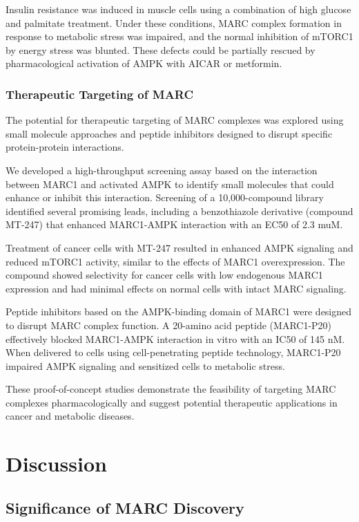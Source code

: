 \documentclass[11pt,a4paper]{article}
\begin{document}
Insulin resistance was induced in muscle cells using a combination of high glucose and palmitate treatment. Under these conditions, MARC complex formation in response to metabolic stress was impaired, and the normal inhibition of mTORC1 by energy stress was blunted. These defects could be partially rescued by pharmacological activation of AMPK with AICAR or metformin.

\subsubsection{Therapeutic Targeting of MARC}

The potential for therapeutic targeting of MARC complexes was explored using small molecule approaches and peptide inhibitors designed to disrupt specific protein-protein interactions.

We developed a high-throughput screening assay based on the interaction between MARC1 and activated AMPK to identify small molecules that could enhance or inhibit this interaction. Screening of a 10,000-compound library identified several promising leads, including a benzothiazole derivative (compound MT-247) that enhanced MARC1-AMPK interaction with an EC50 of 2.3 muM.

Treatment of cancer cells with MT-247 resulted in enhanced AMPK signaling and reduced mTORC1 activity, similar to the effects of MARC1 overexpression. The compound showed selectivity for cancer cells with low endogenous MARC1 expression and had minimal effects on normal cells with intact MARC signaling.

Peptide inhibitors based on the AMPK-binding domain of MARC1 were designed to disrupt MARC complex function. A 20-amino acid peptide (MARC1-P20) effectively blocked MARC1-AMPK interaction in vitro with an IC50 of 145 nM. When delivered to cells using cell-penetrating peptide technology, MARC1-P20 impaired AMPK signaling and sensitized cells to metabolic stress.

These proof-of-concept studies demonstrate the feasibility of targeting MARC complexes pharmacologically and suggest potential therapeutic applications in cancer and metabolic diseases.

\section{Discussion}

\subsection{Significance of MARC Discovery}
\end{document}

